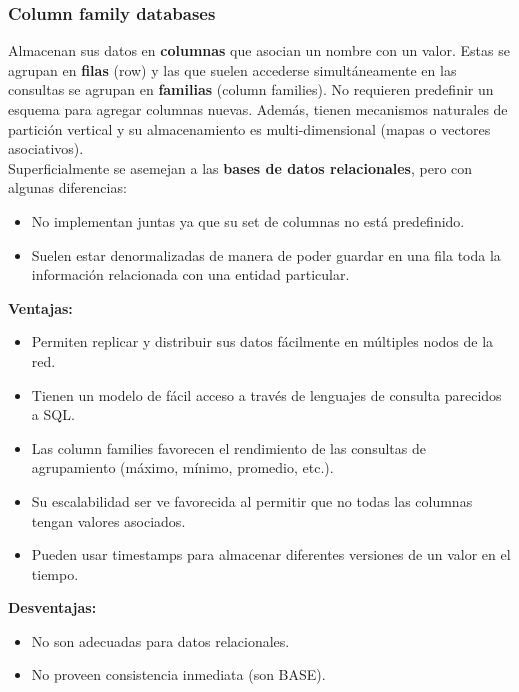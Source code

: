 \subsubsection*{Column family databases}
Almacenan sus datos en \textbf{columnas} que asocian un nombre con un valor. Estas se agrupan en \textbf{filas} (row) y las que suelen accederse simultáneamente en las consultas se agrupan en \textbf{familias} (column families). No requieren predefinir un esquema para agregar columnas nuevas. Además, tienen mecanismos naturales de partición vertical y su almacenamiento es multi-dimensional (mapas o vectores asociativos). \\
Superficialmente se asemejan a las \textbf{bases de datos relacionales}, pero con algunas diferencias:
\begin{itemize}
    \item No implementan juntas ya que su set de columnas no está predefinido.
    \item Suelen estar denormalizadas de manera de poder guardar en una fila toda la información relacionada con una entidad particular.
\end{itemize}
\textbf{Ventajas:}
\begin{itemize}
    \item Permiten replicar y distribuir sus datos fácilmente en múltiples nodos de la red.
    \item Tienen un modelo de fácil acceso a través de lenguajes de consulta parecidos a SQL.
    \item Las column families favorecen el rendimiento de las consultas de agrupamiento (máximo, mínimo, promedio, etc.).
    \item Su escalabilidad ser ve favorecida al permitir que no todas las columnas tengan valores asociados.
    \item Pueden usar timestamps para almacenar diferentes versiones de un valor en el tiempo.
\end{itemize}
\textbf{Desventajas:} 
\begin{itemize}
    \item No son adecuadas para datos relacionales.
    \item No proveen consistencia inmediata (son BASE).
\end{itemize}

